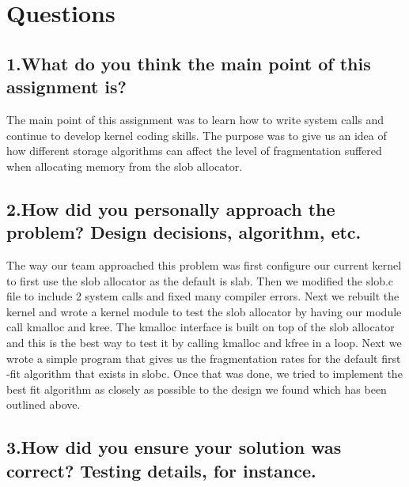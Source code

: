 \documentclass[onecolumn, draftclsnofoot,10pt, compsoc]{IEEEtran}
\begin{document}
	\section*{Questions}
	\subsection*{1.What do you think the main point of this assignment is?}
	The main point of this assignment was to learn how to write system calls and continue to develop
	 kernel coding skills. The purpose was to give us an idea of how different storage algorithms can affect the level of fragmentation suffered when allocating memory from the slob allocator.

	\subsection*{2.How did you personally approach the problem? Design decisions, algorithm, etc.}
	The way our team approached this problem was first configure our current kernel to first use the slob allocator as the default is slab. Then we modified the slob.c file to include 2 system calls and fixed many compiler errors. Next we rebuilt the kernel and wrote a kernel module to test the slob allocator by having our module call kmalloc and kree. The kmalloc interface is built on top of the slob allocator and this is the best way to test it by calling kmalloc and kfree in a loop. Next we wrote a simple program that gives us the fragmentation rates for the default first -fit algorithm that exists in slobc.
		Once that was done, we tried to implement the best fit algorithm as closely as possible to the design we found which has been outlined above.

	\subsection*{3.How did you ensure your solution was correct? Testing details, for instance.}
\end{document}
